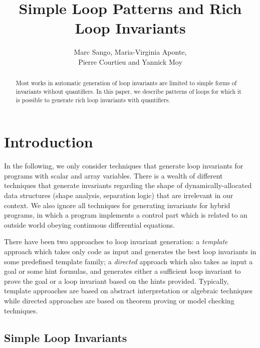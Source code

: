 \documentclass[a4paper,10pt]{article}
\begin{document}
\title{Simple Loop Patterns and Rich Loop Invariants}
\author{Marc Sango, Maria-Virginia Aponte, \\ Pierre Courtieu and Yannick Moy}
\date{}

\maketitle

\begin{abstract}
  Most works in automatic generation of loop invariants are limited to simple
  forms of invariants without quantifiers. In this paper, we describe patterns
  of loops for which it is possible to generate rich loop invariants with
  quantifiers.
\end{abstract}

\section{Introduction}

In the following, we only consider techniques that generate loop invariants for
programs with scalar and array variables. There is a wealth of different
techniques that generate invariants regarding the shape of
dynamically-allocated data structures (shape analysis, separation logic) that
are irrelevant in our context. We also ignore all techniques for generating
invariants for hybrid programs, in which a program implements a control part
which is related to an outside world obeying continuous differential equations.

There have been two approaches to loop invariant generation: a
\textit{template} approach which takes only code as input and generates the
best loop invariants in some predefined template family; a \textit{directed}
approach which also takes as input a goal or some hint formulas, and generates
either a sufficient loop invariant to prove the goal or a loop invariant based
on the hints provided. Typically, template approaches are based on abstract
interpretation or algebraic techniques while directed approaches are based on
theorem proving or model checking techniques.

\subsection{Simple Loop Invariants}
\end{document}

